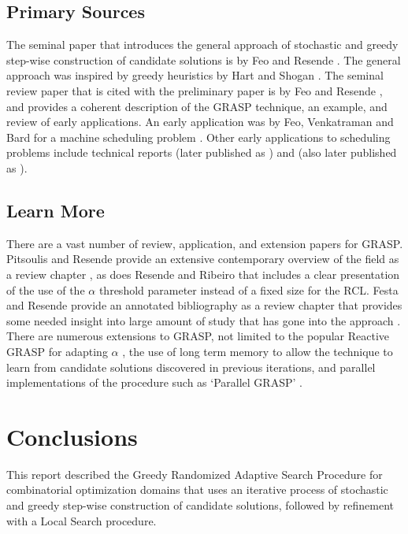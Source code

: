 \documentclass[a4paper, 11pt]{article}
\begin{document}
% 
% 
\subsection{Primary Sources}
The seminal paper that introduces the general approach of stochastic and greedy step-wise construction of candidate solutions is by Feo and Resende \cite{Feo1989}. The general approach was inspired by greedy heuristics by Hart and Shogan \cite{Hart1987}. The seminal review paper that is cited with the preliminary paper is by Feo and Resende \cite{Feo1995}, and provides a coherent description of the GRASP technique, an example, and review of early applications.
An early application was by Feo, Venkatraman and Bard for a machine scheduling problem \cite{Feo1991}. Other early applications to scheduling problems include technical reports \cite{Feo1993} (later published as \cite{Bard1996}) and \cite{Feo1994} (also later published as \cite{Feo1996}).

% 
% 
\subsection{Learn More}
There are a vast number of review, application, and extension papers for GRASP.
Pitsoulis and Resende provide an extensive contemporary overview of the field as a review chapter \cite{Pitsoulis2002}, as does Resende and Ribeiro that includes a clear presentation of the use of the $\alpha$ threshold parameter instead of a fixed size for the RCL. Festa and Resende provide an annotated bibliography as a review chapter that provides some needed insight into large amount of study that has gone into the approach \cite{Festa2002}.
There are numerous extensions to GRASP, not limited to the popular Reactive GRASP for adapting $\alpha$ \cite{Prais2000}, the use of long term memory to allow the technique to learn from candidate solutions discovered in previous iterations, and parallel implementations of the procedure such as `Parallel GRASP' \cite{Pardalos1995}.


% 
% 
\section{Conclusions}
\label{sec:conclusions}
This report described the Greedy Randomized Adaptive Search Procedure for combinatorial optimization domains that uses an iterative process of stochastic and greedy step-wise construction of candidate solutions, followed by refinement with a Local Search procedure.
\end{document}
